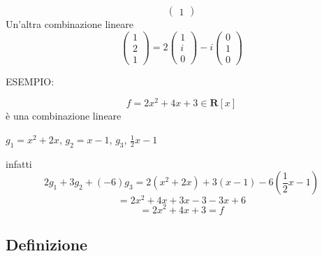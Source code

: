 \documentclass[12pt]{article}
\begin{document}
\begin{center}
\[\begin{pmatrix}
        1
    \end{pmatrix}\]
    Un'altra combinazione lineare
    \[\begin{pmatrix}
        1\\
        2\\
        1
    \end{pmatrix} = 2\begin{pmatrix}
        1\\
        i\\
        0
    \end{pmatrix} - i\begin{pmatrix}
        0\\
        1\\
        0
    \end{pmatrix}\]
\end{center}
ESEMPIO:

\[f = 2x^2 + 4x + 3 \in \mathbf{R}[x]\]
è una combinazione lineare
\begin{center}
  $g_1 = x^2+2x$, $g_2 = x-1$, $g_3$, $\frac{1}{2}x -1$\\
\end{center}
infatti
\[2g_1 + 3g_2 + (-6)g_3 = 2(x^2+2x) + 3(x-1) - 6\left(\frac{1}{2}x -1\right)\]
\[= 2x^2+4x + 3x-3 - 3x+6\]
\[= 2x^2 + 4x + 3 = f\]

\subsection{Definizione}
\end{document}
